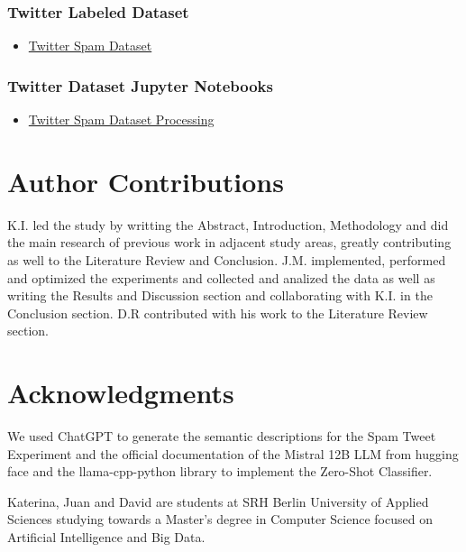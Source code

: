 \documentclass[letterpaper,twocolumn,fleqn]{article}
\begin{document}
\subsubsection{Twitter Labeled Dataset}
\begin{itemize}
  \item \href{https://nsclab.org/nsclab/resources/#spam}{Twitter Spam Dataset}
\end{itemize}
\subsubsection{Twitter Dataset Jupyter Notebooks}
\begin{itemize}
  \item \href{https://colab.research.google.com/drive/1FPIS1mRueLZJ5r3opMw56mtnP2Ivpb48?usp=sharing}{Twitter Spam Dataset Processing}
\end{itemize}



\section*{Author Contributions}

K.I. led the study by writting the Abstract, Introduction, Methodology and did the main research of previous work in adjacent study areas, greatly contributing as well to the Literature Review and Conclusion. J.M. implemented, performed and optimized the experiments and collected and analized the data as well as writing the Results and Discussion section and collaborating with K.I. in the Conclusion section. D.R contributed with his work to the Literature Review section.


\section{Acknowledgments}
We used ChatGPT to generate the semantic descriptions for the Spam Tweet Experiment and the official documentation of the Mistral 12B LLM from hugging face and the llama-cpp-python library to implement the Zero-Shot Classifier.



\small
\nocite{*}
\printbibliography


\begin{biography}
  Katerina, Juan and David are students at SRH Berlin University
  of Applied Sciences studying towards a Master's degree in 
  Computer Science focused on Artificial Intelligence and Big Data.
\end{biography}
\end{document}
